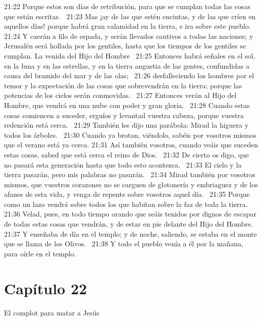 21:22 Porque estos son días de retribución, para que se cumplan todas las cosas que están escritas.  
21:23 Mas ¡ay de las que estén encintas, y de las que críen en aquellos días! porque habrá gran calamidad en la tierra, e ira sobre este pueblo.  
21:24 Y caerán a filo de espada, y serán llevados cautivos a todas las naciones; y Jerusalén será hollada por los gentiles, hasta que los tiempos de los gentiles se cumplan. 
La venida del Hijo del Hombre   
21:25 Entonces habrá señales en el sol, en la luna y en las estrellas, y en la tierra angustia de las gentes, confundidas a causa del bramido del mar y de las olas;  
21:26 desfalleciendo los hombres por el temor y la expectación de las cosas que sobrevendrán en la tierra; porque las potencias de los cielos serán conmovidas.  
21:27 Entonces verán al Hijo del Hombre, que vendrá en una nube con poder y gran gloria.  
21:28 Cuando estas cosas comiencen a suceder, erguíos y levantad vuestra cabeza, porque vuestra redención está cerca.  
21:29 También les dijo una parábola: Mirad la higuera y todos los árboles.  
21:30 Cuando ya brotan, viéndolo, sabéis por vosotros mismos que el verano está ya cerca. 
21:31 Así también vosotros, cuando veáis que suceden estas cosas, sabed que está cerca el reino de Dios.  
21:32 De cierto os digo, que no pasará esta generación hasta que todo esto acontezca.  
21:33 El cielo y la tierra pasarán, pero mis palabras no pasarán.  
21:34 Mirad también por vosotros mismos, que vuestros corazones no se carguen de glotonería y embriaguez y de los afanes de esta vida, y venga de repente sobre vosotros aquel día.  
21:35 Porque como un lazo vendrá sobre todos los que habitan sobre la faz de toda la tierra.  
21:36 Velad, pues, en todo tiempo orando que seáis tenidos por dignos de escapar de todas estas cosas que vendrán, y de estar en pie delante del Hijo del Hombre. 
21:37 Y enseñaba de día en el templo; y de noche, saliendo, se estaba en el monte que se llama de los Olivos.  
21:38 Y todo el pueblo venía a él por la mañana, para oírle en el templo.  
\section*{Capítulo 22}
El complot para matar a Jesús   

